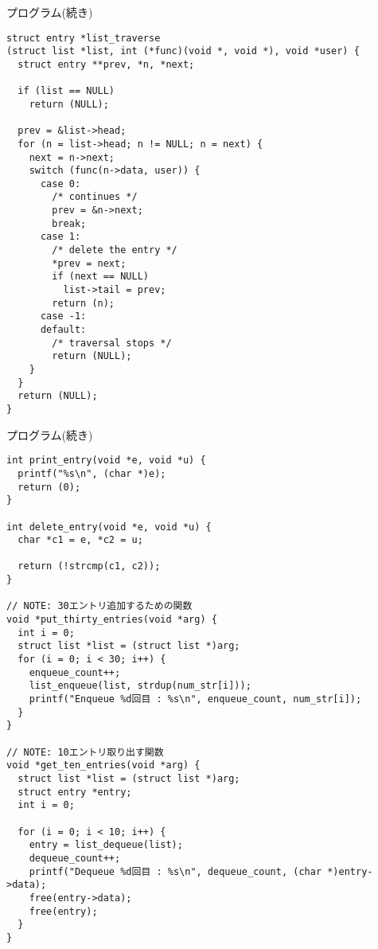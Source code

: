 \documentclass[10pt]{jarticle}
\begin{document}
\begin{itembox}[l]{プログラム(続き)}
  \begin{verbatim}
struct entry *list_traverse
(struct list *list, int (*func)(void *, void *), void *user) {
  struct entry **prev, *n, *next;

  if (list == NULL)
    return (NULL);

  prev = &list->head;
  for (n = list->head; n != NULL; n = next) {
    next = n->next;
    switch (func(n->data, user)) {
      case 0:
        /* continues */
        prev = &n->next;
        break;
      case 1:
        /* delete the entry */
        *prev = next;
        if (next == NULL)
          list->tail = prev;
        return (n);
      case -1:
      default:
        /* traversal stops */
        return (NULL);
    }
  }
  return (NULL);
}
  \end{verbatim}
\end{itembox}

\begin{itembox}[l]{プログラム(続き)}
  \begin{verbatim}
int print_entry(void *e, void *u) {
  printf("%s\n", (char *)e);
  return (0);
}

int delete_entry(void *e, void *u) {
  char *c1 = e, *c2 = u;

  return (!strcmp(c1, c2));
}

// NOTE: 30エントリ追加するための関数
void *put_thirty_entries(void *arg) {
  int i = 0;
  struct list *list = (struct list *)arg;
  for (i = 0; i < 30; i++) {
    enqueue_count++;
    list_enqueue(list, strdup(num_str[i]));
    printf("Enqueue %d回目 : %s\n", enqueue_count, num_str[i]);
  }
}

// NOTE: 10エントリ取り出す関数
void *get_ten_entries(void *arg) {
  struct list *list = (struct list *)arg;
  struct entry *entry;
  int i = 0;

  for (i = 0; i < 10; i++) {
    entry = list_dequeue(list);
    dequeue_count++;
    printf("Dequeue %d回目 : %s\n", dequeue_count, (char *)entry->data);
    free(entry->data);
    free(entry);
  }
}
  \end{verbatim}
\end{itembox}
\end{document}
